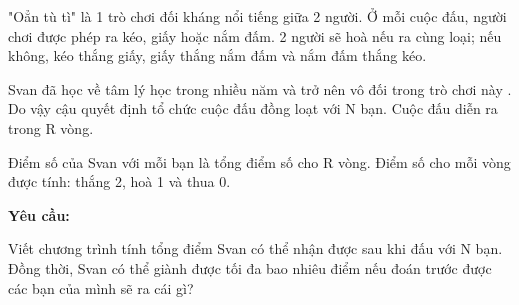 "Oẳn tù tì" là 1 trò chơi đối kháng nổi tiếng giữa 2 người. Ở mỗi cuộc đấu, người chơi được phép ra kéo, giấy hoặc nắm đấm. 2 người sẽ hoà nếu ra cùng loại; nếu không, kéo thắng giấy, giấy thắng nắm đấm và nắm đấm thắng kéo.

Svan đã học về tâm lý học trong nhiều năm và trở nên vô đối trong trò chơi này . Do vậy cậu quyết định tổ chức cuộc đấu đồng loạt với N bạn. Cuộc đấu diễn ra trong R vòng.

Điểm số của Svan với mỗi bạn là tổng điểm số cho R vòng. Điểm số cho mỗi vòng được tính: thắng 2, hoà 1 và thua 0.

\textbf{Yêu cầu:}

Viết chương trình tính tổng điểm Svan có thể nhận được sau khi đấu với N bạn. Đồng thời, Svan có thể giành được tối đa bao nhiêu điểm nếu đoán trước được các bạn của mình sẽ ra cái gì?

\